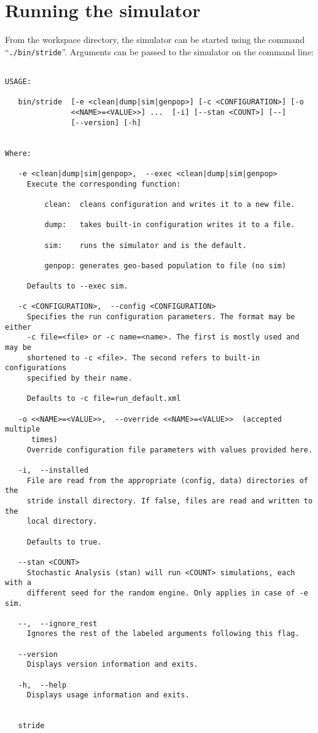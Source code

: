 \newpage
\section{Running the simulator}

From the workspace directory, the simulator can be started  using the command \mbox{``\texttt{./bin/stride}''}. Arguments can be passed to the simulator on the command line:
\begin{verbatim}
 
USAGE: 
 
   bin/stride  [-e <clean|dump|sim|genpop>] [-c <CONFIGURATION>] [-o
               <<NAME>=<VALUE>>] ...  [-i] [--stan <COUNT>] [--]
               [--version] [-h]
 
 
Where: 
 
   -e <clean|dump|sim|genpop>,  --exec <clean|dump|sim|genpop>
     Execute the corresponding function:  
 
         clean:  cleans configuration and writes it to a new file.  
 
         dump:   takes built-in configuration writes it to a file.  
 
         sim:    runs the simulator and is the default.  
 
         genpop: generates geo-based population to file (no sim)
 
     Defaults to --exec sim.
 
   -c <CONFIGURATION>,  --config <CONFIGURATION>
     Specifies the run configuration parameters. The format may be either
     -c file=<file> or -c name=<name>. The first is mostly used and may be
     shortened to -c <file>. The second refers to built-in configurations
     specified by their name.
 
     Defaults to -c file=run_default.xml
 
   -o <<NAME>=<VALUE>>,  --override <<NAME>=<VALUE>>  (accepted multiple
      times)
     Override configuration file parameters with values provided here.
 
   -i,  --installed
     File are read from the appropriate (config, data) directories of the
     stride install directory. If false, files are read and written to the
     local directory. 
 
     Defaults to true.
 
   --stan <COUNT>
     Stochastic Analysis (stan) will run <COUNT> simulations, each with a
     different seed for the random engine. Only applies in case of -e sim.
 
   --,  --ignore_rest
     Ignores the rest of the labeled arguments following this flag.
 
   --version
     Displays version information and exits.
 
   -h,  --help
     Displays usage information and exits.
 
 
   stride
\end{verbatim}

